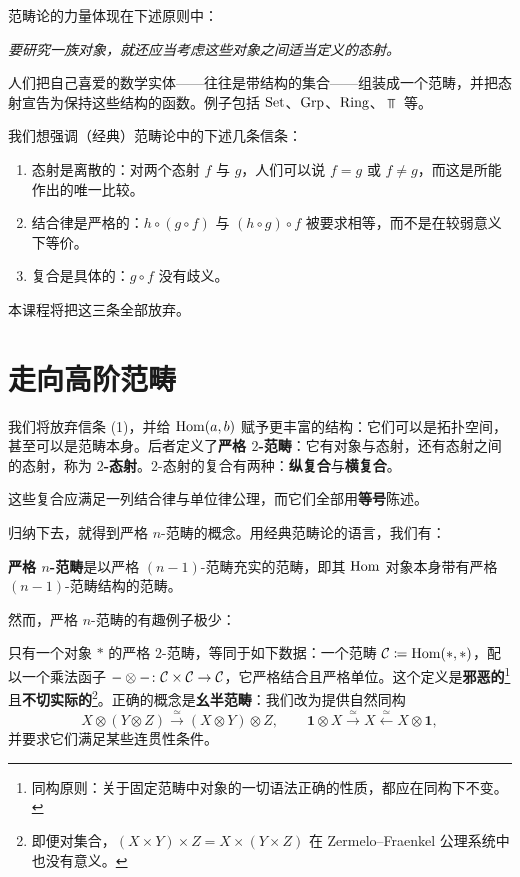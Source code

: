 \nitem\label{L1-2.3} 范畴论的力量体现在下述原则中：
\begin{center}
\emph{要研究一族对象，就还应当考虑这些对象之间适当定义的态射。}
\end{center}
人们把自己喜爱的数学实体——往往是带结构的集合——组装成一个范畴，并把态射宣告为保持这些结构的函数。例子包括 $\operatorname{Set}$、$\operatorname{Grp}$、$\operatorname{Ring}$、$\Top$ 等。

\nitem\label{L1-2.4} 我们想强调（经典）范畴论中的下述几条信条：
\begin{enumerate}[label=(\arabic*),leftmargin=2.4em,itemsep=0.1em]
\item 态射是离散的：对两个态射 $f$ 与 $g$，人们可以说 $f=g$ 或 $f\neq g$，而这是所能作出的唯一比较。
\item 结合律是严格的：$h\circ(g\circ f)$ 与 $(h\circ g)\circ f$ 被要求相等，而不是在较弱意义下等价。
\item 复合是具体的：$g\circ f$ 没有歧义。
\end{enumerate}
本课程将把这三条全部放弃。

\section{走向高阶范畴}

\nitem\label{L1-3.1} 我们将放弃信条 (1)，并给 $\operatorname{Hom}(a,b)$ 赋予更丰富的结构：它们可以是拓扑空间，甚至可以是范畴本身。后者定义了\textbf{严格 $2$-范畴}：它有对象与态射，还有态射之间的态射，称为 \textbf{$2$-态射}。$2$-态射的复合有两种：\textbf{纵复合}与\textbf{横复合}。


这些复合应满足一列结合律与单位律公理，而它们全部用\textbf{等号}陈述。

归纳下去，就得到严格 $n$-范畴的概念。用经典范畴论的语言，我们有：

\begin{definition}\label{L1-3.2}
\textbf{严格 $n$-范畴}是以严格 $(n-1)$-范畴充实的范畴，即其 $\operatorname{Hom}$ 对象本身带有严格 $(n-1)$-范畴结构的范畴。
\end{definition}

\nitem\label{L1-3.3} 然而，严格 $n$-范畴的有趣例子极少：

\begin{example}\label{L1-3.4}
只有一个对象 $\ast$ 的严格 $2$-范畴，等同于如下数据：一个范畴 $\mathcal{C}\coloneqq \operatorname{Hom}(\ast,\ast)$，配以一个乘法函子 $-\otimes -\colon \mathcal{C}\times\mathcal{C}\to\mathcal{C}$，它严格结合且严格单位。这个定义是\textbf{邪恶的}\footnote{同构原则：关于固定范畴中对象的一切语法正确的性质，都应在同构下不变。}且\textbf{不切实际的}\footnote{即便对集合，$(X\times Y)\times Z=X\times(Y\times Z)$ 在 Zermelo--Fraenkel 公理系统中也没有意义。}。正确的概念是\textbf{幺半范畴}：我们改为提供自然同构
\[
X\otimes(Y\otimes Z)\xrightarrow{\ \simeq\ }(X\otimes Y)\otimes Z,\qquad
\mathbf{1}\otimes X\xrightarrow{\ \simeq\ }X\xleftarrow{\ \simeq\ }X\otimes \mathbf{1},
\]
并要求它们满足某些连贯性条件。
\end{example}

